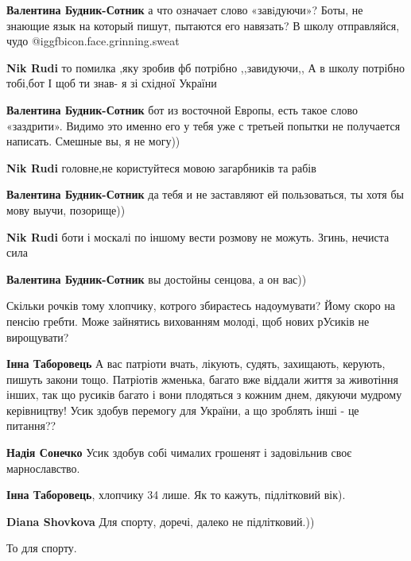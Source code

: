 \begin{itemize}
\begin{itemize}
\textbf{Валентина Будник-Сотник} а что означает слово «завiдуючи»? Боты, не знающие язык на который пишут, пытаются его навязать? В школу отправляйся, чудо @igg{fbicon.face.grinning.sweat} 

\textbf{Nik Rudi} то помилка ,яку зробив фб потрібно ,,завидуючи,,
А в школу потрібно тобі,бот
І щоб ти знав- я зі східної України

\textbf{Валентина Будник-Сотник} бот из восточной Европы, есть такое слово «заздрити». Видимо это именно его у тебя уже с третьей попытки не получается написать. Смешные вы, я не могу))

\textbf{Nik Rudi} головне,не користуйтеся мовою загарбників та рабів

\textbf{Валентина Будник-Сотник} да тебя и не заставляют ей пользоваться, ты хотя бы мову выучи, позорище))

\textbf{Nik Rudi} боти і москалі по іншому вести розмову не можуть.
Згинь, нечиста сила

\textbf{Валентина Будник-Сотник} вы достойны сенцова, а он вас))

\end{itemize} %


Скільки рочків тому хлопчику, котрого збираєтесь надоумувати? Йому скоро на
пенсію гребти. Може зайнятись вихованням молоді, щоб нових рУсиків не
вирощувати?

\begin{itemize} %
\textbf{Інна Таборовець} А вас патріоти вчать, лікують, судять, захищають, керують, пишуть закони тощо. Патріотів жменька, багато вже віддали життя за животіння інших, так що русиків багато і вони плодяться з кожним днем, дякуючи мудрому керівництву! Усик здобув перемогу для України, а що зроблять інші - це питання??

\textbf{Надія Сонечко} Усик здобув собі чималих грошенят і задовільнив своє марнославство.

\textbf{Інна Таборовець}, хлопчику 34 лише. Як то кажуть, підлітковий вік).

\textbf{Diana Shovkova} Для спорту, доречі, далеко не підлітковий.))

То для спорту.


\end{itemize}
\end{itemize}
